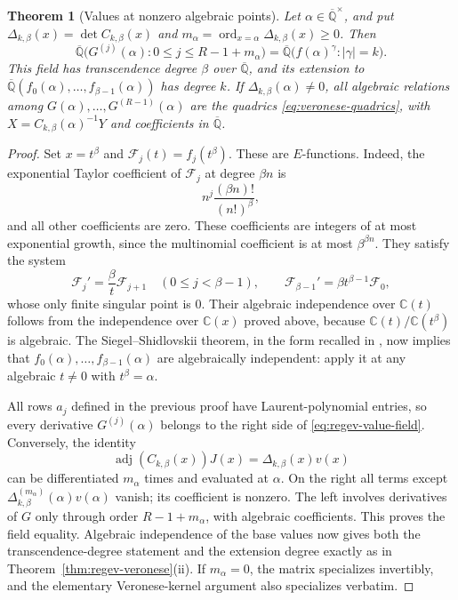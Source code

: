 \documentclass[11pt]{amsart}
\newtheorem{thm}{Theorem}[section]
\theoremstyle{definition}
\newcommand{\C}{\mathbb C}
\newcommand{\Q}{\mathbb Q}
\begin{document}
\begin{thm}[Values at nonzero algebraic points]
\label{thm:regev-values}
Let $\alpha\in\overline{\Q}^{\times}$, and put
$\Delta_{k,\beta}(x)=\det C_{k,\beta}(x)$ and
$m_\alpha=\operatorname{ord}_{x=\alpha}\Delta_{k,\beta}(x)\ge0$.
Then
\begin{equation}\label{eq:regev-value-field}
 \overline{\Q}\bigl(G^{(j)}(\alpha):0\le j\le R-1+m_\alpha\bigr)
 =\overline{\Q}\bigl(f(\alpha)^\gamma:|\gamma|=k\bigr).
\end{equation}
This field has transcendence degree $\beta$ over
$\overline{\Q}$, and its extension to
$\overline{\Q}(f_0(\alpha),\ldots,f_{\beta-1}(\alpha))$
has degree $k$.
If $\Delta_{k,\beta}(\alpha)\ne0$, all algebraic relations among
$G(\alpha),\ldots,G^{(R-1)}(\alpha)$ are the quadrics
\eqref{eq:veronese-quadrics}, with
$X=C_{k,\beta}(\alpha)^{-1}Y$ and coefficients in
$\overline{\Q}$.
\end{thm}

\begin{proof}
Set $x=t^\beta$ and $\mathcal F_j(t)=f_j(t^\beta)$.
These are $E$-functions.  Indeed, the exponential Taylor
coefficient of $\mathcal F_j$ at degree $\beta n$ is
\[
 n^j\frac{(\beta n)!}{(n!)^\beta},
\]
and all other coefficients are zero.  These coefficients are
integers of at most exponential growth, since the multinomial
coefficient is at most $\beta^{\beta n}$.  They satisfy the system
\[
 \mathcal F_j'=\frac\beta t\mathcal F_{j+1}
 \quad(0\le j<\beta-1),\qquad
 \mathcal F_{\beta-1}'=\beta t^{\beta-1}\mathcal F_0,
\]
whose only finite singular point is $0$.  Their algebraic
independence over $\C(t)$ follows from the independence over
$\C(x)$ proved above, because $\C(t)/\C(t^\beta)$ is algebraic.
The Siegel--Shidlovskii theorem, in the form recalled in
\cite[Theorem~1.1]{Beu06}, now implies that
$f_0(\alpha),\ldots,f_{\beta-1}(\alpha)$ are algebraically
independent: apply it at any algebraic $t\ne0$ with $t^\beta=\alpha$.

All rows $a_j$ defined in the previous proof have Laurent-polynomial
entries, so every derivative $G^{(j)}(\alpha)$ belongs to the
right side of \eqref{eq:regev-value-field}.  Conversely, the identity
\[
 \operatorname{adj}(C_{k,\beta}(x))J(x)
 =\Delta_{k,\beta}(x)v(x)
\]
can be differentiated $m_\alpha$ times and evaluated at $\alpha$.
On the right all terms except
$\Delta_{k,\beta}^{(m_\alpha)}(\alpha)v(\alpha)$ vanish; its
coefficient is nonzero.  The left involves derivatives of $G$
only through order $R-1+m_\alpha$, with algebraic coefficients.
This proves the field equality.  Algebraic independence of the
base values now gives both the transcendence-degree statement and
the extension degree exactly as in
Theorem~\ref{thm:regev-veronese}(ii).  If $m_\alpha=0$, the matrix
specializes invertibly, and the elementary Veronese-kernel argument
also specializes verbatim.
\end{proof}
\end{document}
